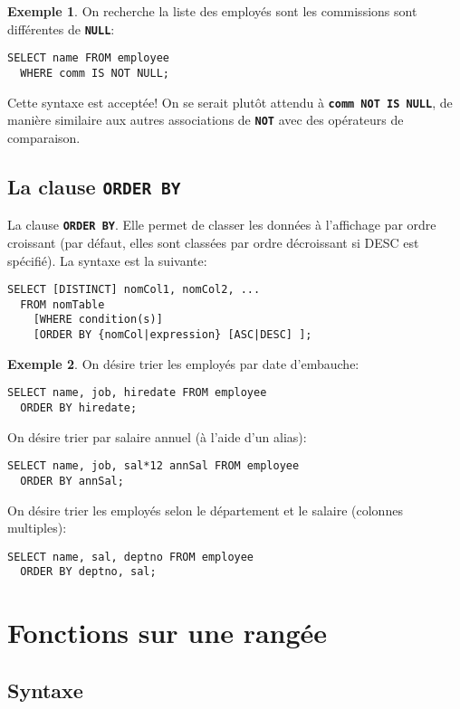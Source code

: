 \documentclass[a4paper, 12pt]{report}
\newcommand{\textSQL}[1]{\texttt{\textbf{#1}}}
\theoremstyle{definition} \newtheorem{ex}{Exemple}
\begin{document}
\begin{ex}
On recherche la liste des employés sont les commissions sont différentes de \textSQL{NULL}:
	\begin{lstlisting}[frame=single]
SELECT name FROM employee
  WHERE comm IS NOT NULL;
  \end{lstlisting}
Cette syntaxe est acceptée! On se serait plutôt attendu à \textSQL{comm NOT IS NULL}, de manière similaire aux autres associations de \textSQL{NOT} avec des opérateurs de comparaison.
\end{ex}


\section{La clause \textSQL{ORDER BY}}
La clause \textSQL{ORDER BY}. Elle permet de classer les données à l'affichage par ordre croissant (par défaut, elles sont classées par ordre décroissant si DESC est spécifié). La syntaxe est la suivante:
\begin{lstlisting}[frame=single]
SELECT [DISTINCT] nomCol1, nomCol2, ...
  FROM nomTable
	[WHERE condition(s)]
	[ORDER BY {nomCol|expression} [ASC|DESC] ];
\end{lstlisting}
\begin{ex}
On désire trier les employés par date d'embauche:
	\begin{lstlisting}[frame=single]
SELECT name, job, hiredate FROM employee
  ORDER BY hiredate;
\end{lstlisting}
On désire trier par salaire annuel (à l'aide d'un alias):
	\begin{lstlisting}[frame=single]
SELECT name, job, sal*12 annSal FROM employee
  ORDER BY annSal;
\end{lstlisting}
On désire trier  les employés selon le département et le salaire (colonnes multiples):
	\begin{lstlisting}[frame=single]
SELECT name, sal, deptno FROM employee
  ORDER BY deptno, sal;
\end{lstlisting}
\end{ex}

\chapter{Fonctions sur une rangée}

\section{Syntaxe}
\end{document}
